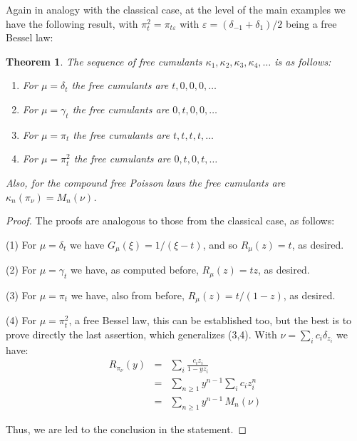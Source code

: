 \documentclass[12pt]{amsbook}
\newtheorem{theorem}{Theorem}[chapter]
\begin{document}
Again in analogy with the classical case, at the level of the main examples we have the following result, with $\pi^2_t=\pi_{t\varepsilon}$ with $\varepsilon=(\delta_{-1}+\delta_1)/2$ being a free Bessel law:

\begin{theorem}
The sequence of free cumulants $\kappa_1,\kappa_2,\kappa_3,\kappa_4,\ldots$ is as follows:
\begin{enumerate}
\item For $\mu=\delta_t$ the free cumulants are $t,0,0,0,\ldots$

\item For $\mu=\gamma_t$ the free cumulants are $0,t,0,0,\ldots$

\item For $\mu=\pi_t$ the free cumulants are $t,t,t,t,\ldots$

\item For $\mu=\pi_t^2$ the free cumulants are $0,t,0,t,\ldots$
\end{enumerate}
Also, for the compound free Poisson laws the free cumulants are $\kappa_n(\pi_\nu)=M_n(\nu)$.
\end{theorem}

\begin{proof}
The proofs are analogous to those from the classical case, as follows:

\medskip

(1) For $\mu=\delta_t$ we have $G_\mu(\xi)=1/(\xi-t)$, and so $R_\mu(z)=t$, as desired.

\medskip

(2) For $\mu=\gamma_t$ we have, as computed before, $R_\mu(z)=tz$, as desired.

\medskip

(3) For $\mu=\pi_t$ we have, also from before, $R_\mu(z)=t/(1-z)$, as desired.

\medskip

(4) For $\mu=\pi_t^2$, a free Bessel law, this can be established too, but the best is to prove directly the last assertion, which generalizes (3,4). With $\nu=\sum_ic_i\delta_{z_i}$ we have:
\begin{eqnarray*}
R_{\pi_\nu}(y)
&=&\sum_i\frac{c_iz_i}{1-yz_i}\\
&=&\sum_{n\geq1}y^{n-1}\sum_ic_iz_i^n\\
&=&\sum_{n\geq 1}y^{n-1}\,M_n(\nu)
\end{eqnarray*}

Thus, we are led to the conclusion in the statement.
\end{proof}
\end{document}
